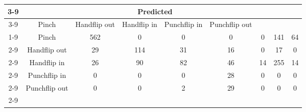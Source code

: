 \documentclass{standalone}
\begin{document}
 
 \begin{tabular}{|c |c |c |c |c |c |c |c |c |}
\cline{3-9}\multicolumn{2}{c|}{} & \multicolumn{7}{c|}{Predicted} \\ 
\cline{3-9} \multicolumn{2}{c |}{ } & Pinch & Handflip out & Handflip in & Punchflip in & Punchflip out\\ 
\cline{1-9}\multirow{7}{*}{\rotatebox[origin=c]{90}{Actual}} & Pinch & 562 & 0 & 0 & 0 & 0 & 141 & 64\\ 
 \cline{2-9} & Handflip out & 29 & 114 & 31 & 16 & 0 & 17 & 0\\ 
 \cline{2-9} & Handflip in & 26 & 90 & 82 & 46 & 14 & 255 & 14\\ 
 \cline{2-9} & Punchflip in & 0 & 0 & 0 & 28 & 0 & 0 & 0\\ 
 \cline{2-9} & Punchflip out & 0 & 0 & 2 & 29 & 0 & 0 & 0\\ 
 \cline{2-9}\hline \end{tabular}
 
\end{document}
